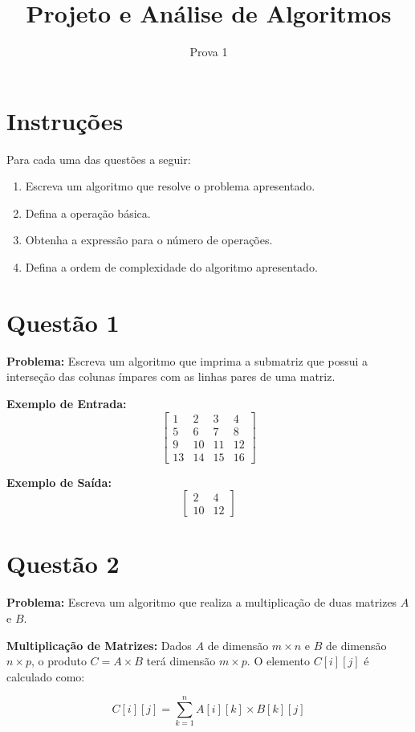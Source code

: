 \documentclass[12pt]{article}
\title{\vspace{-2cm} Projeto e Análise de Algoritmos}
\author{Prova 1}
\date{}
\begin{document}
\maketitle

\section*{Instruções}
Para cada uma das questões a seguir:
\begin{enumerate}[noitemsep] 
    \item Escreva um algoritmo que resolve o problema apresentado.
    \item Defina a operação básica.
    \item Obtenha a expressão para o número de operações.
    \item Defina a ordem de complexidade do algoritmo apresentado.  
\end{enumerate}

\section*{Questão 1}
\textbf{Problema:} Escreva um algoritmo que imprima a submatriz que possui a interseção das colunas ímpares com as linhas pares de uma matriz.

\textbf{Exemplo de Entrada:}
\[
\begin{bmatrix}
1 & 2 & 3 & 4 \\
5 & 6 & 7 & 8 \\
9 & 10 & 11 & 12 \\
13 & 14 & 15 & 16
\end{bmatrix}
\]

\textbf{Exemplo de Saída:}
\[
\begin{bmatrix}
2 & 4 \\
10 & 12
\end{bmatrix}
\]


\section*{Questão 2}
\textbf{Problema:} Escreva um algoritmo que realiza a multiplicação de duas matrizes \(A\) e \(B\).

\textbf{Multiplicação de Matrizes:} Dados \(A\) de dimensão \(m \times n\) e \(B\) de dimensão \(n \times p\), o produto \(C = A \times B\) terá dimensão \(m \times p\). O elemento \(C[i][j]\) é calculado como:

\[
C[i][j] = \sum_{k=1}^{n} A[i][k] \times B[k][j]
\]
\end{document}
